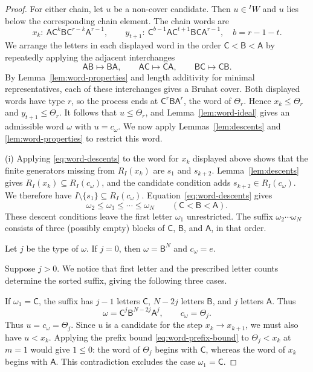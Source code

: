 \documentclass[11pt,a4paper,reqno]{amsart}
\numberwithin{equation}{section}
\theoremstyle{definition}
\theoremstyle{remark}
\theoremstyle{plain}
\newcommand{\A}{\mathsf A}
\newcommand{\B}{\mathsf B}
\newcommand{\CC}{\mathsf C}
\begin{document}
\begin{proof}
For either chain, let $u$ be a non-cover candidate. Then
$u\in{}^I W$ and $u$ lies below the corresponding chain element.
The chain words are
\[
 x_k:\ \A\CC^k\B\CC^{r-k}\A^{r-1},\qquad
 y_{t+1}:\ \CC^{b-1}\A\CC^{t+1}\B\CC\A^{r-1},
 \quad b=r-1-t.
\]
We arrange the letters in each displayed word in the order
$\CC<\B<\A$ by repeatedly applying the adjacent interchanges
\[
 \A\B\longmapsto\B\A,\qquad
 \A\CC\longmapsto\CC\A,\qquad
 \B\CC\longmapsto\CC\B.
\]
By Lemma~\ref{lem:word-properties} and length additivity for minimal
representatives, each of these interchanges gives a Bruhat cover.
Both displayed words have type $r$, so the process ends at
$\CC^r\B\A^r$, the word of $\Theta_r$. Hence
$x_k\leq\Theta_r$ and $y_{t+1}\leq\Theta_r$.
It follows that $u\leq\Theta_r$, and
Lemma~\ref{lem:word-ideal} gives an admissible word $\omega$ with
$u=c_\omega$. We now apply Lemmas~\ref{lem:descents} and
\ref{lem:word-properties} to restrict this word.

\smallskip\noindent
\textup{(i)} Applying \eqref{eq:word-descents} to the word for $x_k$
displayed above shows that the finite generators missing from
$R_I(x_k)$ are $s_1$ and $s_{k+2}$. 
Lemma~\ref{lem:descents} gives
$R_I(x_k)\subseteq R_I(c_\omega)$, and the candidate condition adds
$s_{k+2}\in R_I(c_\omega)$. 
We therefore have $I\setminus\{s_1\}\subseteq R_I(c_\omega)$.
Equation~\eqref{eq:word-descents} gives
\[
 \omega_2\leq\omega_3\leq\cdots\leq\omega_N
 \qquad(\CC<\B<\A).
\]
These descent conditions leave the first letter $\omega_1$ unrestricted.
The suffix $\omega_2\cdots\omega_N$ consists of three (possibly empty)
blocks of $\CC$, $\B$, and $\A$, in that order.

Let $j$ be the type of $\omega$.
If $j=0$, then $\omega=\B^N$ and $c_\omega=e$.

Suppose $j>0$. 
We notice that first letter and the prescribed letter counts
determine the sorted suffix, giving the following three cases.

If $\omega_1=\CC$, the suffix has $j-1$ letters $\CC$,
$N-2j$ letters $\B$, and $j$ letters $\A$. Thus
\[
 \omega=\CC^j\B^{N-2j}\A^j,\qquad c_\omega=\Theta_j.
\]
Thus $u=c_\omega=\Theta_j$. Since $u$ is a candidate for the step
$x_k\to x_{k+1}$, we must also have $u<x_k$.
Applying the prefix bound \eqref{eq:word-prefix-bound} to
$\Theta_j<x_k$ at $m=1$ would give $1\leq0$: the word of
$\Theta_j$ begins with $\CC$, whereas the word of $x_k$ begins
with $\A$. This contradiction excludes the case $\omega_1=\CC$.


\end{proof}
\end{document}
